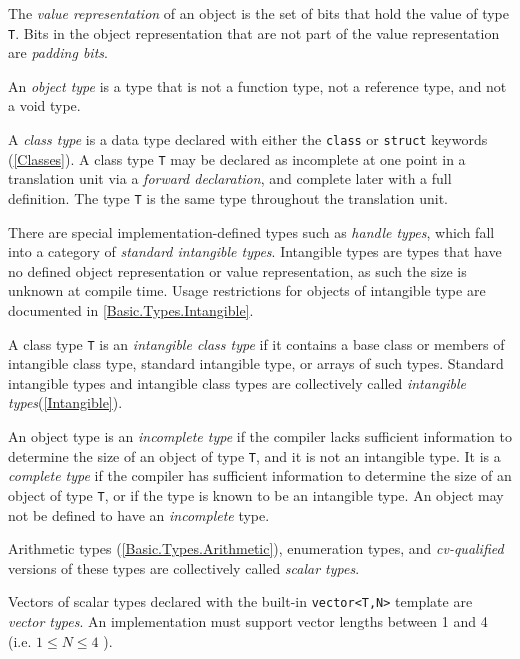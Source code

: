 \p The \textit{value representation} of an object is the set of bits that hold
the value of type \texttt{T}. Bits in the object representation that are not
part of the value representation are \textit{padding bits}.

\p An \textit{object type} is a type that is not a function type, not a
reference type, and not a void type.

\p A \textit{class type} is a data type declared with either the \texttt{class}
or \texttt{struct} keywords (\ref{Classes}). A class type \texttt{T} may be
declared as incomplete at one point in a translation unit via a \textit{forward
declaration}, and complete later with a full definition. The type \texttt{T} is
the same type throughout the translation unit.

\p There are special implementation-defined types such as \textit{handle types},
which fall into a category of \textit{standard intangible types}. Intangible
types are types that have no defined object representation or value
representation, as such the size is unknown at compile time. Usage restrictions
for objects of intangible type are documented in \ref{Basic.Types.Intangible}.

\p A class type \texttt{T} is an \textit{intangible class type} if it contains
a base class or members of intangible class type, standard intangible type,
or arrays of such types. Standard intangible types and intangible class types
are collectively called \textit{intangible types}(\ref{Intangible}).

\p An object type is an \textit{incomplete type} if the compiler lacks
sufficient information to determine the size of an object of type \texttt{T},
and it is not an intangible type. It is a \textit{complete type} if the compiler
has sufficient information to determine the size of an object of type
\texttt{T}, or if the type is known to be an intangible type. An object may not
be defined to have an \textit{incomplete} type.

\p Arithmetic types (\ref{Basic.Types.Arithmetic}), enumeration types, and
\textit{cv-qualified} versions of these types are collectively called
\textit{scalar types}.

\p Vectors of scalar types declared with the built-in \texttt{vector<T,N>}
template are \textit{vector types}. An implementation must support vector
lengths between 1 and 4 (i.e. \( 1 \leq N \leq 4 \) ).

